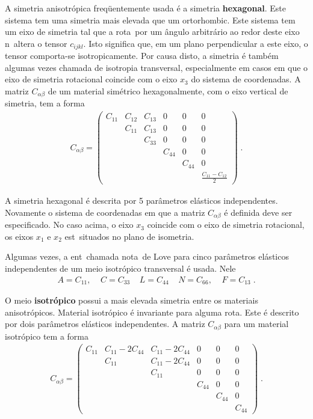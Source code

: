 A simetria anisotr\'opica freq\"uentemente usada \'e a
simetria {\bf hexagonal}. Este sistema tem uma simetria
mais elevada que um ortorhombic. Este sistema tem um eixo
de simetria tal que a rota\cao\ por um \^angulo
arbitr\'ario ao redor deste eixo n\ao\ altera o tensor
$c_{ijkl}$. Isto significa que, em um plano perpendicular
a este eixo, o tensor comporta-se isotropicamente. Por
causa disto, a simetria \'e tamb\'em algumas vezes
chamada de isotropia transversal, especialmente em
casos em que o eixo de simetria rotacional coincide com o
eixo $x_3$ do sistema de coordenadas. A matriz
$C_{\alpha \beta}$ de um material sim\'etrico
hexagonalmente, com o eixo vertical de simetria, tem a
forma
\begin{eqnarray}
C_{\alpha \beta} = \left(
\begin{array}{cccccc}
C_{11} & C_{12} & C_{13} & 0      & 0      & 0 \\
       & C_{11} & C_{13} & 0      & 0      & 0 \\
       &        & C_{33} & 0      & 0      & 0 \\
       &        &        & C_{44} & 0      & 0 \\
       &        &        &        & C_{44} & 0 \\
       &        &        & & & \frac{C_{11}-C_{12}}{2}
\end{array} \right) \; .
\end{eqnarray}

A simetria hexagonal \'e descrita por 5 par\^ametros
el\'asticos independentes. Novamente o sistema de
coordenadas em que a matriz $C_{\alpha \beta}$ \'e
definida deve ser especificado. No caso acima, o eixo
$x_3$ coincide com o eixo de simetria rotacional, os
eixos $x_1$ e $x_2$ est\ao\ situados no plano de
isometria.

Algumas vezes, a ent\ao\ chamada nota\cao\ de Love para
cinco par\^ametros el\'asticos independentes de um meio
 isotr\'opico transversal \'e usada. Nele
\begin{eqnarray}
A=C_{11}, \;\;\;\; C=C_{33} \;\;\;\; L=C_{44} \;\;\;\;
N=C_{66}, \;\;\;\; F=C_{13} \; .
\end{eqnarray}

O meio {\bf isotr\'opico} possui a mais elevada simetria entre
os materiais anisotr\'opicos. Material isotr\'opico \'e
invariante para alguma rota\cao. Este \'e descrito por
dois par\^ametros el\'asticos independentes. A matriz
$C_{\alpha \beta}$ para um material isotr\'opico tem a
forma
\begin{eqnarray}
C_{\alpha \beta} = \left(
\begin{array}{cccccc}
C_{11} & C_{11}-2C_{44} & C_{11}-2C_{44} & 0 & 0 & 0 \\
       & C_{11} & C_{11}-2C_{44} & 0 & 0 & 0 \\
       &        & C_{11} & 0 & 0 & 0 \\
       &        &        & C_{44} & 0      & 0 \\
       &        &        &        & C_{44} & 0 \\
       &        &        &  &  & C_{44}
\end{array} \right) \; .
\end{eqnarray}


